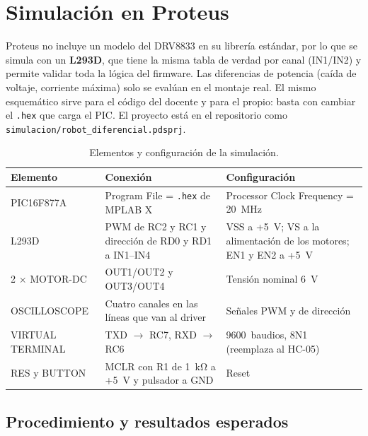 \section{Simulación en Proteus}
\label{sec:simulacion}

Proteus no incluye un modelo del DRV8833 en su librería estándar, por lo que se
simula con un \textbf{L293D}, que tiene la misma tabla de verdad por canal
(IN1/IN2) y permite validar toda la lógica del firmware. Las diferencias de
potencia (caída de voltaje, corriente máxima) solo se evalúan en el montaje
real. El mismo esquemático sirve para el código del docente y para el propio:
basta con cambiar el \texttt{.hex} que carga el PIC. El proyecto está en el
repositorio como \texttt{simulacion/\allowbreak robot\_diferencial.pdsprj}.

\begin{table}[H]
  \centering
  \caption{Elementos y configuración de la simulación.}
  \label{tab:proteus}
  \small
  \begin{tabularx}{\textwidth}{@{}l L L@{}}
    \toprule
    \textbf{Elemento} & \textbf{Conexión} & \textbf{Configuración} \\
    \midrule
    PIC16F877A       & Program File = \texttt{.hex} de MPLAB X & Processor Clock Frequency = \SI{20}{\mega\hertz} \\
    L293D            & PWM de RC2 y RC1 y dirección de RD0 y RD1 a IN1--IN4 & VSS a +\SI{5}{\volt}; VS a la alimentación de los motores; EN1 y EN2 a +\SI{5}{\volt} \\
    2 $\times$ MOTOR-DC & OUT1/OUT2 y OUT3/OUT4 & Tensión nominal \SI{6}{\volt} \\
    OSCILLOSCOPE     & Cuatro canales en las líneas que van al driver & Señales PWM y de dirección \\
    VIRTUAL TERMINAL & TXD $\rightarrow$ RC7, RXD $\rightarrow$ RC6 & 9600~baudios, 8N1 (reemplaza al HC-05) \\
    RES y BUTTON     & MCLR con R1 de \SI{1}{\kilo\ohm} a +\SI{5}{\volt} y pulsador a GND & Reset \\
    \bottomrule
  \end{tabularx}
\end{table}

\subsection{Procedimiento y resultados esperados}

